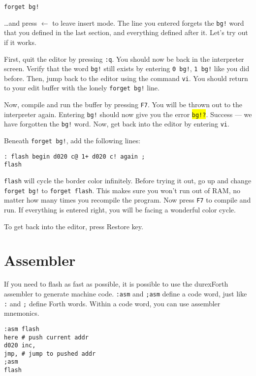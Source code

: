 \begin{verbatim}
forget bg!
\end{verbatim}

\ldots and press $\leftarrow$ to leave insert mode. The line you entered forgets the \texttt{bg!} word that you defined in the last section, and everything defined after it. Let's try out if it works.

First, quit the editor by pressing \texttt{:q}. You should now be back in the interpreter screen.
Verify that the word \texttt{bg!} still exists by  entering \texttt{0 bg!}, \texttt{1 bg!} like you did
before. Then, jump back to the editor using the command \texttt{vi}. You should return to your edit buffer with the lonely \texttt{forget bg!} line.

Now, compile and run the buffer by pressing \texttt{F7}. You will be thrown out to the interpreter
again. Entering \texttt{bg!} should now give you the error \colorbox{yellow}{\texttt{bg!?}}. Success
--- we have forgotten the \texttt{bg!} word. Now, get back into the editor by entering \texttt{vi}.

Beneath \texttt{forget bg!}, add the following lines:

\begin{verbatim}
: flash begin d020 c@ 1+ d020 c! again ;
flash
\end{verbatim}

\texttt{flash} will cycle the border color infinitely. Before trying it out, go up and change \texttt{forget bg!} to \texttt{forget flash}. This makes sure you won't run out of RAM, no matter how many times you recompile the program. Now press \texttt{F7} to compile and run. If everything is entered right, you will be facing a wonderful color cycle.

To get back into the editor, press Restore key. 

\section{Assembler}

If you need to flash as fast as possible, it is possible to use the durexForth assembler to generate machine code. \texttt{:asm} and \texttt{;asm} define a code word, just like \texttt{:} and \texttt{;} define Forth words. Within a code word, you can use assembler mnemonics. 

\begin{verbatim}
:asm flash
here # push current addr
d020 inc,
jmp, # jump to pushed addr
;asm
flash
\end{verbatim}


